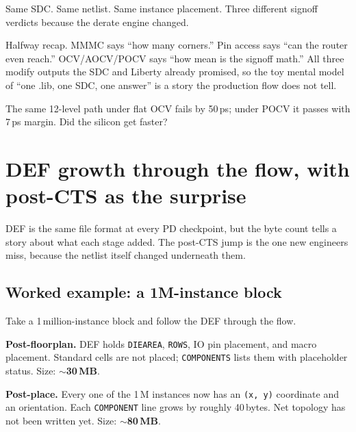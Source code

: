 Same SDC. Same netlist. Same instance placement. Three different signoff verdicts because the derate engine changed.

\begin{pausebox}
Halfway recap. MMMC says ``how many corners.'' Pin access says ``can the router even reach.'' OCV/AOCV/POCV says ``how mean is the signoff math.'' All three modify outputs the SDC and Liberty already promised, so the toy mental model of ``one .lib, one SDC, one answer'' is a story the production flow does not tell.
\end{pausebox}

\begin{gut}
The same 12-level path under flat OCV fails by 50\,ps; under POCV it passes with 7\,ps margin. Did the silicon get faster?
\end{gut}

\section{DEF growth through the flow, with post-CTS as the surprise}

DEF is the same file format at every PD checkpoint, but the byte count tells a story about what each stage added. The post-CTS jump is the one new engineers miss, because the netlist itself changed underneath them.

\subsection{Worked example: a 1M-instance block}

Take a 1\,million-instance block and follow the DEF through the flow.

 \textbf{Post-floorplan.} DEF holds \texttt{DIEAREA}, \texttt{ROWS}, IO pin placement, and macro placement. Standard cells are not placed; \texttt{COMPONENTS} lists them with placeholder status. Size: \textbf{$\sim$30\,MB}.

 \textbf{Post-place.} Every one of the 1\,M instances now has an \texttt{(x, y)} coordinate and an orientation. Each \texttt{COMPONENT} line grows by roughly 40\,bytes. Net topology has not been written yet. Size: \textbf{$\sim$80\,MB}.

